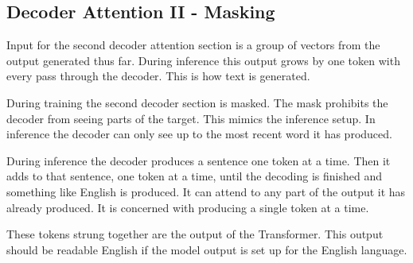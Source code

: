\subsection{Decoder Attention II - Masking}
Input for the second decoder attention section is a group of vectors from the output generated thus far. During inference this output grows by one token with every pass through the decoder. This is how text is generated.

During training the second decoder section is masked. The mask prohibits the decoder from seeing parts of the target. This mimics the inference setup. In inference the decoder can only see up to the most recent word it has produced.

During inference the decoder produces a sentence one token at a time. Then it adds to that sentence, one token at a time, until the decoding is finished and something like English is produced. It can attend to any part of the output it has already produced. It is concerned with producing a single token at a time.

These tokens strung together are the output of the Transformer. This output should be readable English if the model output is set up for the English language.

